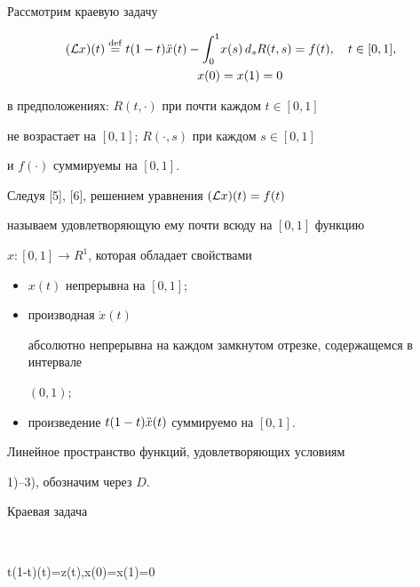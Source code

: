\begin{exam}


Рассмотрим краевую задачу


\begin{equation}


\begin{split}


({\cal L}x)(t)


\eqdef t(1-t)\Ddot{x}(t) - \int_0^1 &x(s)\,d_sR(t,s) = f(t),\quad


t\in[0,1],\\


%


x(0)&=x(1)=0


\end{split}


\end{equation}


в предположениях: $R(t,\cdot)$ при почти каждом $t\in[0,1]$


не возрастает на $[0,1]$; $R(\cdot,s)$ при каждом $s\in[0,1]$


и $f(\cdot)$ суммируемы на $[0,1]$.


Следуя [5], [6], решением уравнения $({\cal L}x)(t)=f(t)$


называем удовлетворяющую ему почти всюду на $[0,1]$ функцию


$x:[0,1]\to R^1$, которая обладает свойствами


\begin{itemize}


\item[1)] $x(t)$ непрерывна на $[0,1]$;


\item[2)] производная $\Dot{x}(t)$


абсолютно непрерывна на каждом замкнутом отрезке, содержащемся в интервале


$(0,1)$;


\item[3)] произведение $t(1-t)\Ddot{x}(t)$ суммируемо на $[0,1]$.


\end{itemize}


Линейное пространство функций, удовлетворяющих условиям


1)--3), обозначим через $D$.





Краевая задача


$$


t(1-t)(t)=z(t),\quad x(0)=x(1)=0



\end{exam}
